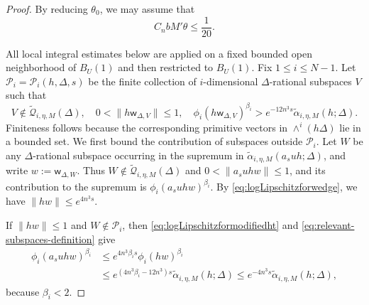 \documentclass[reqno,11pt]{amsart}
\numberwithin{equation}{section}
\theoremstyle{definition}
\theoremstyle{remark}
\begin{document}
\begin{proof}
By reducing $\theta_0$, we may assume that
\begin{equation}\label{eq:theta-small-global-contraction}
C_nbM'\theta\le\frac1{20}.
\end{equation}

All local integral estimates below are applied on a fixed bounded open
neighborhood of $B_{U}(1)$ and then restricted to $B_{U}(1)$.
Fix $1\le i\le N-1$. Let
$\mathcal P_i=\mathcal P_i(h,\Delta,s)$ be the finite collection
of $i$-dimensional $\Delta$-rational subspaces $V$ such that
\begin{equation}\label{eq:relevant-subspaces-definition}
V\notin\widetilde{\mathscr Q}_{i,\eta,M}(\Delta),
\quad
0<\|h\mathsf w_{\Delta,V}\|\le1,
\quad 
\phi_i(h\mathsf w_{\Delta,V})^{\beta_i}
>e^{-12n^3s}\widetilde\alpha_{i,\eta,M}(h;\Delta).
\end{equation}
Finiteness follows because the corresponding primitive vectors in
$\wedge^i(h\Delta)$ lie in a bounded set.
We first bound the contribution of subspaces outside
$\mathcal P_i$. Let $W$ be any $\Delta$-rational subspace occurring
in the supremum in
$\widetilde\alpha_{i,\eta,M}(a_suh;\Delta)$, and write $w:=\mathsf w_{\Delta,W}$. Thus $W\notin\widetilde{\mathscr Q}_{i,\eta,M}(\Delta)$ and $0<\|a_suhw\|\le1$, and its contribution to the supremum is
$\phi_i(a_suhw)^{\beta_i}$. By
\eqref{eq:logLipschitzforwedge}, we have $\|hw\|\le e^{4n^3s}$.

If
$\|hw\|\le1$ and $W\notin\mathcal P_i$, then
\eqref{eq:logLipschitzformodifiedht} and
\eqref{eq:relevant-subspaces-definition} give
\begin{equation}
\begin{aligned}
        \phi_i(a_suhw)^{\beta_i}
&\le e^{4n^3\beta_i s}\phi_i(hw)^{\beta_i}
\\&\le e^{(4n^3\beta_i-12n^3)s}
\widetilde\alpha_{i,\eta,M}(h;\Delta)
\le e^{-4n^3s}\widetilde\alpha_{i,\eta,M}(h;\Delta),
\end{aligned}
\end{equation}
because $\beta_i<2$.


\end{proof}
\end{document}
